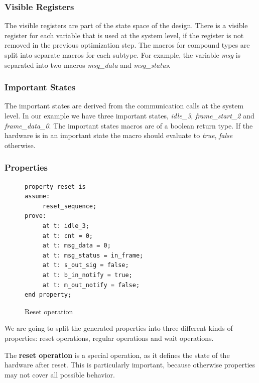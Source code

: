 \subsubsection{Visible Registers}

The visible registers are part of the state space of the design. 
There is a visible register for each variable that is used at the system level, if the register is not removed in the previous optimization step. 
The macros for compound types are split into separate macros for each subtype. 
For example, the variable \textit{msg} is separated into two macros \textit{msg\_data} and \textit{msg\_status}.

\subsubsection{Important States}

The important states are derived from the communication calls at the system level. 
In our example we have three important states, \textit{idle\_3}, \textit{frame\_start\_2} and \textit{frame\_data\_0}. 
The important states macros are of a boolean return type.
If the hardware is in an important state the macro should evaluate to \textit{true}, \textit{false} otherwise. 

\subsubsection{Properties}

\begin{figure}
	\vspace{-20pt}
	\caption{Reset operation}
	\label{fig:reset_operation}
\begin{verbatim}
property reset is
assume:
	 reset_sequence;
prove:
	 at t: idle_3;
	 at t: cnt = 0;
	 at t: msg_data = 0;
	 at t: msg_status = in_frame;
	 at t: s_out_sig = false;
	 at t: b_in_notify = true;
	 at t: m_out_notify = false;
end property;
\end{verbatim}
\end{figure}

We are going to split the generated properties into three different kinds of properties: reset 
operations, regular operations and wait operations.

The \textbf{reset operation} is a special operation, as it defines the state of the hardware after reset. 
This is particularly important, because otherwise properties may not cover all possible behavior. 

